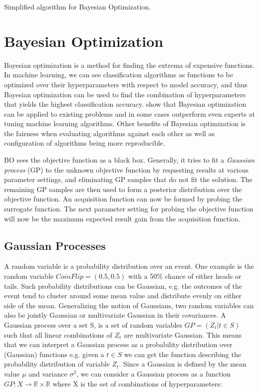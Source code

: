 \begin{algorithm*}
	\caption{Simplified algorithm for Bayesian Optimization.}
	\label{alg:bayesian-optimization}
\end{algorithm*}
\section{Bayesian Optimization}\label{sec:bayesian-optimization}
Bayesian optimization is a method for finding the extrema of expensive functions. In machine learning, we can see classification algorithms as functions to be optimized over their hyperparameters with respect to model accuracy, and thus Bayesian optimization can be used to find the combination of hyperparameters that yields the highest classification accuracy. \citet{snoek2012practical} show that Bayesian optimization can be applied to existing problems and in some cases outperform even experts at tuning machine learning algorithms. Other benefits of Bayesian optimization is the fairness when evaluating algorithms against each other as well as configuration of algorithms being more reproducible.

BO sees the objective function as a black box. Generally, it tries to fit a \emph{Gaussian process} (GP) to the unknown objective function by requesting results at various parameter settings, and eliminating GP samples that do not fit the solution. The remaining GP samples are then used to form a posterior distribution over the objective function. An acquisition function can now be formed by probing the surrogate function. The next parameter setting for probing the objective function will now be the maximum expected result gain from the acquisition function.

\subsection{Gaussian Processes}
A random variable is a probability distribution over an event. One example is the random variable $CoinFlip = (0.5, 0.5)$ with a 50\% chance of either heads or tails. Such probability distributions can be Gaussian, e.g. the outcomes of the event tend to cluster around some mean value and distribute evenly on either side of the mean. Generalizing the notion of Gaussians, two random variables can also be jointly Gaussian or multivariate Gaussian in their covariances. A Gaussian process over a set S, is a set of random variables $GP = (Z_t | t \in S)$ such that all linear combinations of $Z_t$ are multivariate Gaussian. This means that we can interpret a Gaussian process as a probability distribution over (Gaussian) functions e.g. given a $t \in S$ we can get the function describing the probability distribution of variable $Z_t$. Since a Gaussian is defined by the mean value $\mu$ and variance $\sigma^2$, we can consider a Gaussian process as a function $GP : X \rightarrow \mathbb{R} \times \mathbb{R}$ where X is the set of combinations of hyperparameters:

